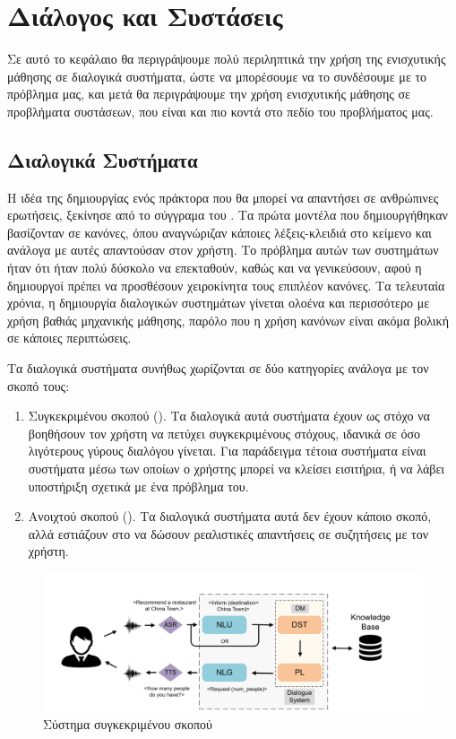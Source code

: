 \chapter{Διάλογος και Συστάσεις}

Σε αυτό το κεφάλαιο θα περιγράψουμε πολύ περιληπτικά την χρήση της ενισχυτικής μάθησης σε διαλογικά συστήματα, ώστε να μπορέσουμε να το συνδέσουμε με το πρόβλημα μας, και μετά θα περιγράψουμε την χρήση ενισχυτικής μάθησης σε προβλήματα συστάσεων, που είναι και πιο κοντά στο πεδίο του προβλήματος μας.

\section{Διαλογικά Συστήματα}

Η ιδέα της δημιουργίας ενός πράκτορα που θα μπορεί να απαντήσει σε ανθρώπινες ερωτήσεις, ξεκίνησε από το σύγγραμα του  \cite{turing1950computing}. Τα πρώτα μοντέλα που δημιουργήθηκαν βασίζονταν σε κανόνες, όπου αναγνώριζαν κάποιες λέξεις-κλειδιά στο κείμενο και ανάλογα με αυτές απαντούσαν στον χρήστη. Το πρόβλημα αυτών των συστημάτων ήταν ότι ήταν πολύ δύσκολο να επεκταθούν, καθώς και να γενικεύσουν, αφού η δημιουργοί πρέπει να προσθέσουν χειροκίνητα τους επιπλέον κανόνες. Τα τελευταία χρόνια, η δημιουργία διαλογικών συστημάτων γίνεται ολοένα και περισσότερο με χρήση βαθιάς μηχανικής μάθησης, παρόλο που η χρήση κανόνων είναι ακόμα βολική σε κάποιες περιπτώσεις.

Tα διαλογικά συστήματα συνήθως χωρίζονται σε δύο κατηγορίες ανάλογα με τον σκοπό τους:
\begin{enumerate}
    \item Συγκεκριμένου σκοπού (). Τα διαλογικά αυτά συστήματα έχουν ως στόχο να βοηθήσουν τον χρήστη να πετύχει συγκεκριμένους στόχους, ιδανικά σε όσο λιγότερους γύρους διαλόγου γίνεται. Για παράδειγμα τέτοια συστήματα είναι συστήματα μέσω των οποίων ο χρήστης μπορεί να κλείσει εισιτήρια, ή να λάβει υποστήριξη σχετικά με ένα πρόβλημα του.
    \item Ανοιχτού σκοπού (). Τα διαλογικά συστήματα αυτά δεν έχουν κάποιο σκοπό, αλλά εστιάζουν στο να δώσουν ρεαλιστικές απαντήσεις σε συζητήσεις με τον χρήστη.
\end{enumerate}

\begin{figure}
    \centering
    \includegraphics[width=\textwidth]{body_matter/dialogue_and_recommendations/images/task-based-dialogue-system.png}
    \caption{Σύστημα συγκεκριμένου σκοπού \cite{recent_advances_dl_2021}}
    \label{fig:task_based_system}
\end{figure}

